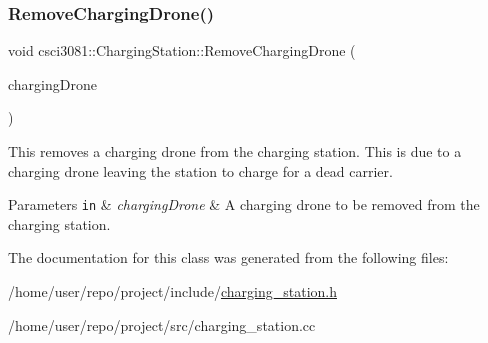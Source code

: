 \subsubsection{\texorpdfstring{Remove\+Charging\+Drone()}{RemoveChargingDrone()}}
{\footnotesize\ttfamily void csci3081\+::\+Charging\+Station\+::\+Remove\+Charging\+Drone (\begin{DoxyParamCaption}\item[{\hyperlink{classcsci3081_1_1RechargeDrone}{Recharge\+Drone} $\ast$}]{charging\+Drone }\end{DoxyParamCaption})}



This removes a charging drone from the charging station. This is due to a charging drone leaving the station to charge for a dead carrier. 


\begin{DoxyParams}[1]{Parameters}
\mbox{\tt in}  & {\em charging\+Drone} & A charging drone to be removed from the charging station. \\
\hline
\end{DoxyParams}


The documentation for this class was generated from the following files\+:\begin{DoxyCompactItemize}
\item 
/home/user/repo/project/include/\hyperlink{charging__station_8h}{charging\+\_\+station.\+h}\item 
/home/user/repo/project/src/charging\+\_\+station.\+cc\end{DoxyCompactItemize}
